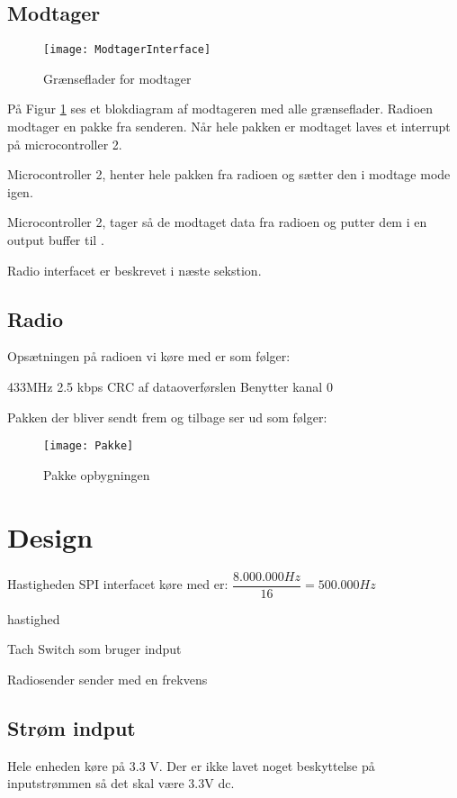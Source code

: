\documentclass[Main]{subfiles}
\begin{document}
\subsection{Modtager}

\begin{figure}[H]
\centering
\texttt{[image: ModtagerInterface]}
\caption{Grænseflader for modtager}
\label{fig: ModtagerInterface}
\end{figure}
På Figur \ref{fig: ModtagerInterface} ses et blokdiagram af modtageren med alle grænseflader.
Radioen modtager en pakke fra senderen. Når hele pakken er modtaget laves et interrupt på microcontroller 2.

Microcontroller 2, henter hele pakken fra radioen og sætter den i modtage mode igen. 

Microcontroller 2, tager så de modtaget data fra radioen og putter dem i en output buffer til \itoc.

Radio interfacet er beskrevet i næste sekstion.


\subsection{Radio}
Opsætningen på radioen vi køre med er som følger:

433MHz
2.5 kbps
CRC af dataoverførslen
Benytter kanal 0

Pakken der bliver sendt frem og tilbage ser ud som følger:
\begin{figure}[H]
\centering
\texttt{[image: Pakke]}
\caption{Pakke opbygningen}
\label{fig: Pakke}
\end{figure}
\section{Design}

Hastigheden SPI interfacet køre med er:
$ \dfrac{8.000.000 Hz}{16} = 500.000Hz $

\itoc hastighed

Tach Switch som bruger indput

Radiosender sender med en frekvens 

\subsection{Strøm indput}

Hele enheden køre på 3.3 V.
Der er ikke lavet noget beskyttelse på inputstrømmen så det skal være 3.3V dc.
\end{document}
